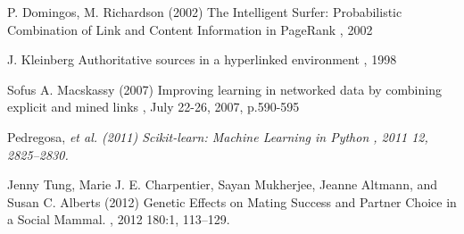 \documentclass[twoside,twocolumn,paper=letter,fontsize=11pt]{article}
\begin{document}

\begin{thebibliography}{99} %

P. Domingos, M. Richardson (2002) 
\newblock
 The Intelligent Surfer: Probabilistic Combination of Link and Content Information in PageRank
, 2002

J. Kleinberg
\newblock
Authoritative sources in a hyperlinked environment
, 1998

Sofus A. Macskassy (2007) 
\newblock
Improving learning in networked data by combining explicit and mined links
, July 22-26, 2007, p.590-595
 
  Pedregosa, \em{et al.} (2011)
  \newblock
  Scikit-learn: Machine Learning in Python
  , 2011 12, 2825--2830.

  Jenny Tung, Marie J. E. Charpentier, Sayan Mukherjee, Jeanne Altmann, and Susan C. Alberts (2012)
\newblock 
  Genetic Effects on Mating Success and Partner Choice in a Social Mammal.
, 2012 180:1, 113--129.

\end{thebibliography}

\end{document}
